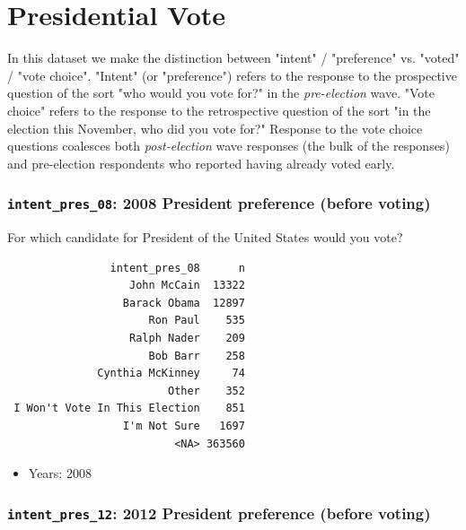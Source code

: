 \documentclass[10pt,article,oneside]{memoir}
\theoremstyle{definition}
\begin{document}
\newpage

\hypertarget{presidential-vote}{%
\section{Presidential Vote}\label{presidential-vote}}

\begin{tcolorbox}[title={A note on \texttt{intent} and \texttt{voted}}]
In this dataset we make the distinction between "intent" / "preference" vs. "voted" / "vote choice". "Intent" (or "preference") refers to the response to the prospective question of the sort "who would you vote for?" in the \emph{pre-election} wave. "Vote choice" refers to the response to the retrospective question of the sort "in the election this November, who did you vote for?" Response to the vote choice questions coalesces both \emph{post-election} wave responses (the bulk of the responses) and pre-election respondents who reported having already voted early. 
\end{tcolorbox}

\hypertarget{intent_pres_08-2008-president-preference-before-voting}{%
\subsubsection{\texorpdfstring{\texttt{intent\_pres\_08}: 2008 President
preference (before
voting)}{intent\_pres\_08: 2008 President preference (before voting)}}\label{intent_pres_08-2008-president-preference-before-voting}}

For which candidate for President of the United States would you vote?

\begin{verbatim}
                intent_pres_08      n
                   John McCain  13322
                  Barack Obama  12897
                      Ron Paul    535
                   Ralph Nader    209
                      Bob Barr    258
              Cynthia McKinney     74
                         Other    352
 I Won't Vote In This Election    851
                  I'm Not Sure   1697
                          <NA> 363560
\end{verbatim}

\begin{itemize}
\tightlist
\item
  Years: 2008
\end{itemize}

\hypertarget{intent_pres_12-2012-president-preference-before-voting}{%
\subsubsection{\texorpdfstring{\texttt{intent\_pres\_12}: 2012 President
preference (before
voting)}{intent\_pres\_12: 2012 President preference (before voting)}}\label{intent_pres_12-2012-president-preference-before-voting}}
\end{document}
